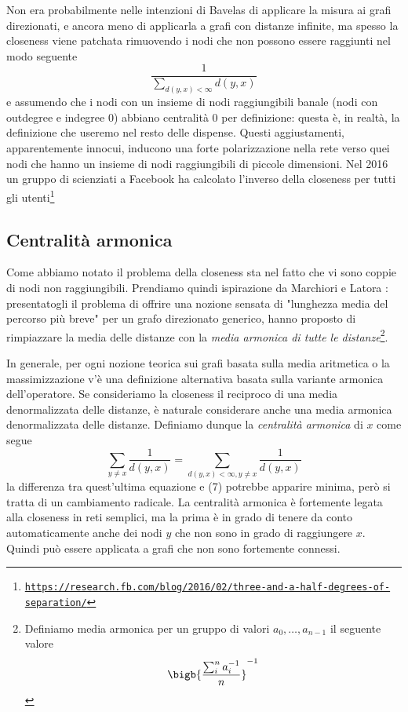 Non era probabilmente nelle intenzioni di Bavelas di applicare la misura ai grafi direzionati, e ancora meno di applicarla a grafi con distanze infinite, ma spesso la closeness viene patchata rimuovendo i nodi che non possono essere raggiunti nel modo seguente
\begin{equation}
	\frac{1}{\sum_{d(y, x) < \infty}d(y, x)}
\end{equation}
e assumendo che i nodi con un insieme di nodi raggiungibili banale (nodi con outdegree e indegree 0) abbiano centralità 0 per definizione: questa è, in realtà, la definizione che useremo nel resto delle dispense. Questi aggiustamenti, apparentemente innocui, inducono una forte polarizzazione nella rete verso quei nodi che hanno un insieme di nodi raggiungibili di piccole dimensioni. Nel 2016 un gruppo di scienziati a Facebook ha calcolato l'inverso della closeness per tutti gli utenti\footnote{\texttt{\href{https://research.fb.com/blog/2016/02/three-and-a-half-degrees-of-separation/}{https://research.fb.com/blog/2016/02/three-and-a-half-degrees-of-separation/}}}
\subsection{Centralità armonica}
Come abbiamo notato il problema della closeness sta nel fatto che vi sono coppie di nodi non raggiungibili. Prendiamo quindi ispirazione da Marchiori e Latora \cite{armonica}: presentatogli il problema di offrire una nozione sensata di "lunghezza media del percorso più breve" per un grafo direzionato generico, hanno proposto di rimpiazzare la media delle distanze con la \textit{media armonica di tutte le distanze}\footnote{Definiamo media armonica per un gruppo di valori $a_0, \dots, a_{n - 1}$ il seguente valore
	\begin{equation}
		\bigb{\frac{\sum_i^n{a_i^{-1}}}{n}}^{-1}
	\end{equation}
}.

In generale, per ogni nozione teorica sui grafi basata sulla media aritmetica o la massimizzazione
v'è una definizione alternativa basata sulla variante armonica dell'operatore. Se consideriamo la closeness il reciproco di una media denormalizzata delle distanze, è naturale considerare anche una media armonica denormalizzata delle distanze. Definiamo dunque la \textit{centralità armonica} di $x$ come segue
\begin{equation}
	\sum_{y \neq x}{\frac{1}{d(y, x)}} = \sum_{d(y, x) < \infty, y \neq x}{\frac{1}{d(y, x)}}
\end{equation}
la differenza tra quest'ultima equazione e (7) potrebbe apparire minima, però si tratta di un cambiamento radicale. La centralità armonica è fortemente legata alla closeness in reti semplici, ma la prima è in grado di tenere da conto automaticamente anche dei nodi $y$ che non sono in grado di raggiungere $x$. Quindi può essere applicata a grafi che non sono fortemente connessi.
